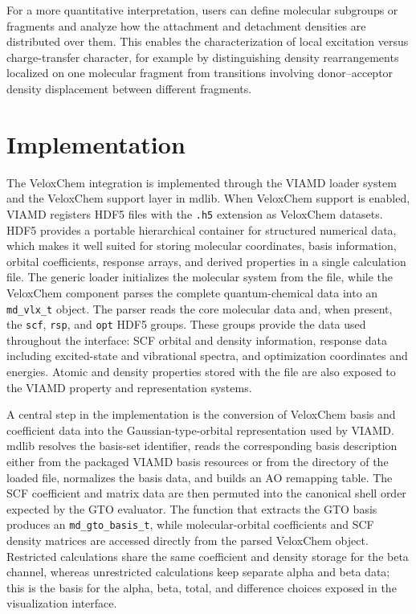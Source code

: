 \documentclass[journal=jacsat,manuscript=article]{achemso}
\begin{document}
For a more quantitative interpretation, users can define molecular subgroups or fragments and analyze how the attachment and detachment densities are distributed over them. This enables the characterization of local excitation versus charge-transfer character, for example by distinguishing density rearrangements localized on one molecular fragment from transitions involving donor--acceptor density displacement between different fragments.

\section{Implementation}
The VeloxChem integration is implemented through the VIAMD loader system and the VeloxChem support layer in mdlib. When VeloxChem support is enabled, VIAMD registers HDF5 files with the \texttt{.h5} extension as VeloxChem datasets. HDF5 provides a portable hierarchical container for structured numerical data, which makes it well suited for storing molecular coordinates, basis information, orbital coefficients, response arrays, and derived properties in a single calculation file.\cite{HDF5} The generic loader initializes the molecular system from the file, while the VeloxChem component parses the complete quantum-chemical data into an \texttt{md\_vlx\_t} object. The parser reads the core molecular data and, when present, the \texttt{scf}, \texttt{rsp}, and \texttt{opt} HDF5 groups. These groups provide the data used throughout the interface: SCF orbital and density information, response data including excited-state and vibrational spectra, and optimization coordinates and energies. Atomic and density properties stored with the file are also exposed to the VIAMD property and representation systems.

A central step in the implementation is the conversion of VeloxChem basis and coefficient data into the Gaussian-type-orbital representation used by VIAMD. mdlib resolves the basis-set identifier, reads the corresponding basis description either from the packaged VIAMD basis resources or from the directory of the loaded file, normalizes the basis data, and builds an AO remapping table. The SCF coefficient and matrix data are then permuted into the canonical shell order expected by the GTO evaluator. The function that extracts the GTO basis produces an \texttt{md\_gto\_basis\_t}, while molecular-orbital coefficients and SCF density matrices are accessed directly from the parsed VeloxChem object. Restricted calculations share the same coefficient and density storage for the beta channel, whereas unrestricted calculations keep separate alpha and beta data; this is the basis for the alpha, beta, total, and difference choices exposed in the visualization interface.
\end{document}
